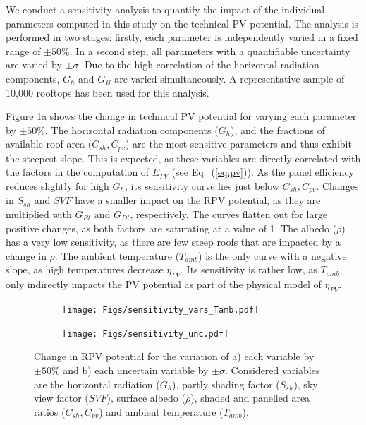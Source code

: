 We conduct a sensitivity analysis to quantify the impact of the individual parameters computed in this study on the technical PV potential. The analysis is performed in two stages: firstly, each parameter is independently varied in a fixed range of $\pm 50\%$. 
In a second step, all parameters with a quantifiable uncertainty are varied by $\pm \sigma$. 
Due to the high correlation of the horizontal radiation components, $G_h$ and $G_B$ are varied simultaneously. A representative sample of 10,000 rooftops has been used for this analysis.

Figure \ref{fig:sens_vars}a shows the change in technical PV potential for varying each parameter by $\pm 50\%$. The horizontal radiation components ($G_h$), and the fractions of available roof area ($C_{sh}, C_{\mathit{pv}}$) are the most sensitive parameters and thus exhibit the steepest slope. 
This is expected, as these variables are directly correlated with the factors in the computation of $E_{PV}$ (see Eq.~(\ref{eq:pv})). 
As the panel efficiency reduces slightly for high $G_h$, its sensitivity curve lies just below $C_{sh}, C_{\mathit{pv}}$.
Changes in $S_{sh}$ and $\mathit{SVF}$ have a smaller impact on the RPV potential, as they are multiplied with $G_{Bt}$ and $G_{Dt}$, respectively. 
The curves flatten out for large positive changes, as both factors are saturating at a value of 1. 
The albedo ($\rho$) has a very low sensitivity, as there are few steep roofs that are impacted by a change in $\rho$.
The ambient temperature ($T_{amb}$) is the only curve with a negative slope, as high temperatures decrease $\eta_{PV}$. Its sensitivity is rather low, as $T_{amb}$ only indirectly impacts the PV potential as part of the physical model of $\eta_{PV}$. 

\begin{figure}[tb]
\centering
\begin{subfigure}{.49\textwidth}
  \centering
  \texttt{[image: Figs/sensitivity\_vars\_Tamb.pdf]}
  \subcaption{}
\end{subfigure}
\begin{subfigure}{.49\textwidth}
  \centering
  \texttt{[image: Figs/sensitivity\_unc.pdf]}  
  \subcaption{}
\end{subfigure}
\caption{Change in RPV potential for the variation of a) each variable by $\pm 50\%$ and b) each uncertain variable by $\pm \sigma$. Considered variables are the horizontal radiation ($G_h$), partly shading factor ($S_{sh}$), sky view factor ($\mathit{SVF}$), surface albedo ($\rho$), shaded and panelled area ratios ($C_{sh}, C_{\mathit{pv}}$) and ambient temperature ($T_{amb}$).}
\label{fig:sens_vars}
\end{figure}

